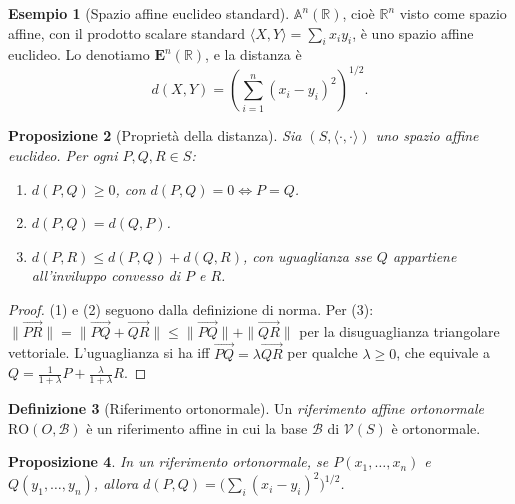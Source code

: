 \documentclass[11pt, a4paper]{book}
\theoremstyle{definition}
\newtheorem{definizione}{Definizione}[section]
\newtheorem{esempio}[definizione]{Esempio}
\theoremstyle{plain}
\newtheorem{proposizione}[definizione]{Proposizione}
\theoremstyle{remark}
\newcommand{\R}{\mathbb{R}}
\begin{document}
\begin{exbox}
\begin{esempio}[Spazio affine euclideo standard]
\label{es:En}
$\mathbb{A}^n(\R)$, cioè $\R^n$ visto come spazio affine, con il prodotto scalare standard $\langle X,Y\rangle = \sum_i x_i y_i$, è uno spazio affine euclideo. Lo denotiamo $\mathbf{E}^n(\R)$, e la distanza è
\[
  d(X,Y) = \left(\sum_{i=1}^n (x_i - y_i)^2\right)^{1/2}.
\]
\end{esempio}
\end{exbox}

\begin{proposizione}[Proprietà della distanza]
\label{prop:distanza}
Sia $(S,\langle\cdot,\cdot\rangle)$ uno spazio affine euclideo. Per ogni $P,Q,R \in S$:
\begin{enumerate}
  \item $d(P,Q) \geq 0$, con $d(P,Q) = 0 \Leftrightarrow P = Q$.
  \item $d(P,Q) = d(Q,P)$.
  \item $d(P,R) \leq d(P,Q) + d(Q,R)$, con uguaglianza sse $Q$ appartiene all'inviluppo convesso di $P$ e $R$.
\end{enumerate}
\end{proposizione}

\begin{proof}
(1) e (2) seguono dalla definizione di norma. Per (3): $\|\overrightarrow{PR}\| = \|\overrightarrow{PQ}+\overrightarrow{QR}\| \leq \|\overrightarrow{PQ}\|+\|\overrightarrow{QR}\|$ per la disuguaglianza triangolare vettoriale. L'uguaglianza si ha iff $\overrightarrow{PQ} = \lambda\overrightarrow{QR}$ per qualche $\lambda \geq 0$, che equivale a $Q = \frac{1}{1+\lambda}P + \frac{\lambda}{1+\lambda}R$.
\end{proof}

\begin{defbox}
\begin{definizione}[Riferimento ortonormale]
\label{def:riferimento-ON}
Un \emph{riferimento affine ortonormale} $\mathrm{RO}(O,\mathcal{B})$ è un riferimento affine in cui la base $\mathcal{B}$ di $\mathcal{V}(S)$ è ortonormale.
\end{definizione}
\end{defbox}

\begin{proposizione}
In un riferimento ortonormale, se $P(x_1,\ldots,x_n)$ e $Q(y_1,\ldots,y_n)$, allora $d(P,Q) = \bigl(\sum_i(x_i-y_i)^2\bigr)^{1/2}$.
\end{proposizione}
\end{document}
